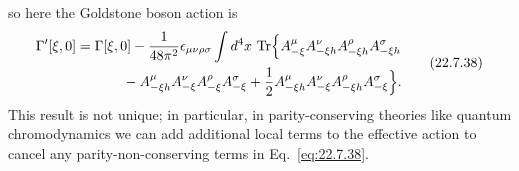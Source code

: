 so here the Goldstone boson action is
\begin{equation}
 \begin{aligned}
 \Gamma'[\xi,0]
 ={}&\Gamma[\xi,0]
 -\frac{1}{48\pi^2}\epsilon_{\mu\nu\rho\sigma}\int d^4x\,
 \operatorname{Tr}\Bigl\{
 A_{-\xi}^\mu A_{-\xi h}^\nu A_{-\xi h}^\rho A_{-\xi h}^\sigma
 \\
 &\qquad{}
 -A_{-\xi h}^\mu A_{-\xi}^\nu A_{-\xi}^\rho A_{-\xi}^\sigma
 +\frac{1}{2}
 A_{-\xi h}^\mu A_{-\xi}^\nu A_{-\xi h}^\rho A_{-\xi}^\sigma
 \Bigr\}.
 \end{aligned}
 \tag{22.7.38}\label{eq:22.7.38}
\end{equation}
This result is not unique; in particular, in parity-conserving theories
like quantum chromodynamics we can add additional local terms to the
effective action to cancel any parity-non-conserving terms in
Eq.~\eqref{eq:22.7.38}.
